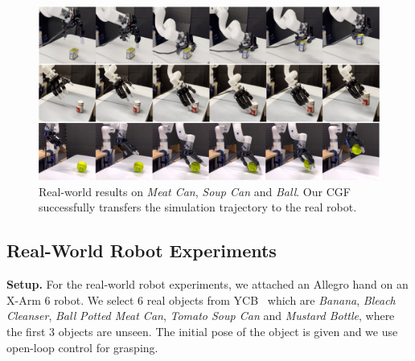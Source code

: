 \documentclass[letterpaper, 10 pt, journal, twoside]{IEEEtran}
\begin{document}
\begin{figure}[t]
\centering
  \vspace{-0.1in}
  \includegraphics[width=0.95\linewidth]{figure/real_w_ball.pdf}
  \vspace{-0.05in}
  \caption{\small
  Real-world results on \textit{Meat Can}, \textit{Soup Can} and \textit{Ball}. Our CGF successfully transfers the simulation trajectory to the real robot.}
  \vspace{-0.2in}
  \label{fig:real}
\end{figure}

\vspace{-0.05in}
\subsection{Real-World Robot Experiments}
\textbf{Setup.} For the real-world robot experiments, we attached an Allegro hand on an X-Arm 6 robot. We select 6 real objects from YCB~\cite{calli2015ycb} which are \textit{Banana}, \textit{Bleach Cleanser}, \textit{Ball} \textit{Potted Meat Can}, \textit{Tomato Soup Can} and \textit{Mustard Bottle}, where the first 3 objects are unseen. The initial pose of the object is given and we use open-loop control for grasping.
\end{document}
